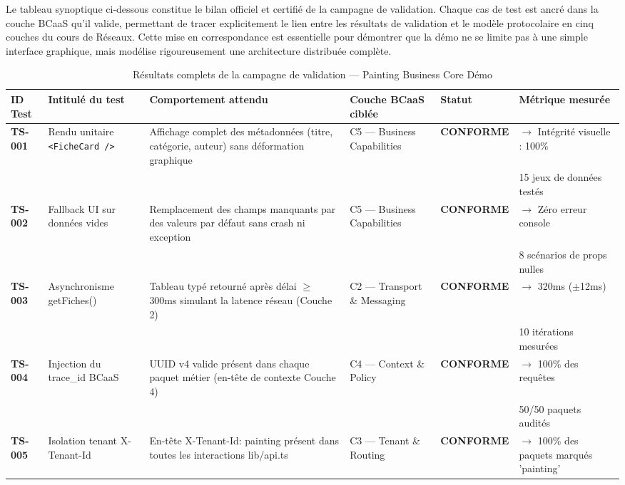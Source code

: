 \documentclass[12pt,a4paper]{report}
\begin{document}
Le tableau synoptique ci-dessous constitue le bilan officiel et certifié de la campagne de validation. Chaque cas de test est ancré dans la couche BCaaS qu'il valide, permettant de tracer explicitement le lien entre les résultats de validation et le modèle protocolaire en cinq couches du cours de Réseaux. Cette mise en correspondance est essentielle pour démontrer que la démo ne se limite pas à une simple interface graphique, mais modélise rigoureusement une architecture distribuée complète.

\begin{table}[H]
\centering
\caption{Résultats complets de la campagne de validation --- Painting Business Core Démo}
\label{tab:test_results}
\renewcommand{\arraystretch}{1.4}
\small
\begin{tabular}{|p{}|p{}|p{}|p{}|p{}|p{}|}
\hline
\textbf{ID Test} & \textbf{Intitulé du test} & \textbf{Comportement attendu} & \textbf{Couche BCaaS ciblée} & \textbf{Statut} & \textbf{Métrique mesurée} \\
\hline
\textbf{TS-001} & Rendu unitaire \texttt{<FicheCard />} & Affichage complet des métadonnées (titre, catégorie, auteur) sans déformation graphique & C5 --- Business Capabilities & \textbf{CONFORME} & $\rightarrow$ Intégrité visuelle : 100\% \\
 & & & & & 15 jeux de données testés \\
\hline
\textbf{TS-002} & Fallback UI sur données vides & Remplacement des champs manquants par des valeurs par défaut sans crash ni exception & C5 --- Business Capabilities & \textbf{CONFORME} & $\rightarrow$ Zéro erreur console \\
 & & & & & 8 scénarios de props nulles \\
\hline
\textbf{TS-003} & Asynchronisme getFiches() & Tableau typé retourné après délai $\geq$ 300ms simulant la latence réseau (Couche 2) & C2 --- Transport \& Messaging & \textbf{CONFORME} & $\rightarrow$ 320ms ($\pm$12ms) \\
 & & & & & 10 itérations mesurées \\
\hline
\textbf{TS-004} & Injection du trace\_id BCaaS & UUID v4 valide présent dans chaque paquet métier (en-tête de contexte Couche 4) & C4 --- Context \& Policy & \textbf{CONFORME} & $\rightarrow$ 100\% des requêtes \\
 & & & & & 50/50 paquets audités \\
\hline
\textbf{TS-005} & Isolation tenant X-Tenant-Id & En-tête X-Tenant-Id: painting présent dans toutes les interactions lib/api.ts & C3 --- Tenant \& Routing & \textbf{CONFORME} & $\rightarrow$ 100\% des paquets marqués 'painting' \\

\end{tabular}
\end{table}
\end{document}
